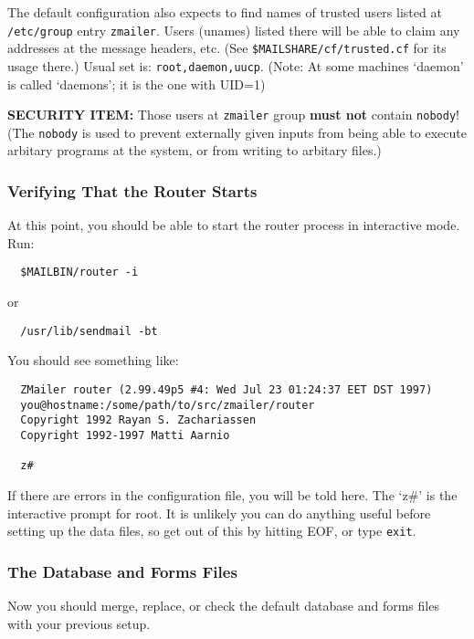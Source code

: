 The default configuration also expects to find names of trusted users
listed at  {\tt /etc/group} entry {\tt zmailer}.  Users (unames) listed there
will be able to claim any addresses at the message headers, etc.
(See {\tt \$MAILSHARE/cf/trusted.cf} for its usage there.)
Usual set is: {\tt root,daemon,uucp}.
(Note: At some machines `daemon' is called `daemons'; it is
the one with UID=1)

{\bf SECURITY ITEM:} Those users at {\tt zmailer} group {\bf must not} contain {\tt nobody}!
(The {\tt nobody} is used to prevent externally given inputs from being
able to execute arbitary programs at the system, or from writing to
arbitary files.)




\subsubsection{Verifying That the Router Starts}

At this point, you should be able to start the router process in
interactive mode.  Run:
\begin{verbatim}
  $MAILBIN/router -i
\end{verbatim}
or
\begin{verbatim}
  /usr/lib/sendmail -bt
\end{verbatim}

You should see something like:
\begin{verbatim}
  ZMailer router (2.99.49p5 #4: Wed Jul 23 01:24:37 EET DST 1997)
  you@hostname:/some/path/to/src/zmailer/router
  Copyright 1992 Rayan S. Zachariassen
  Copyright 1992-1997 Matti Aarnio
  
  z#    
\end{verbatim}

If there are errors in the configuration file, you will be told here.
The `z\#' is the interactive prompt for root. It is unlikely you can do anything useful 
before setting up the data files, so get out of this by hitting EOF, or type {\tt exit}.




\subsubsection{The Database and Forms Files}

Now you should merge, replace, or check the default database and
forms files with your previous setup.

